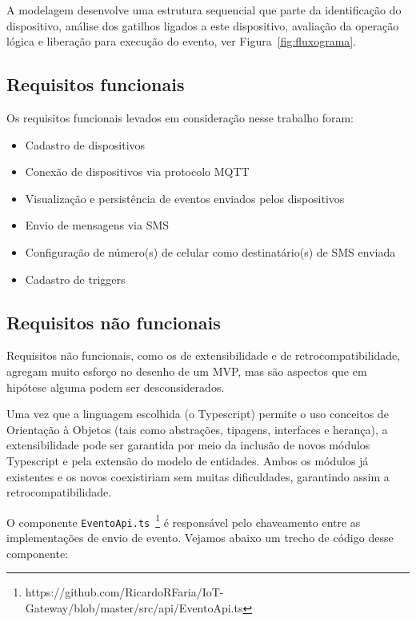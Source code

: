 A modelagem desenvolve uma estrutura sequencial que parte da identificação do dispositivo, análise dos gatilhos ligados a este dispositivo, avaliação da operação lógica e liberação para execução do evento, ver Figura~\ref{fig:fluxograma}.  

\subsection{Requisitos funcionais}
\label{reqFuncionais}

Os requisitos funcionais levados em consideração nesse trabalho foram:

\begin{itemize}
	\item Cadastro de dispositivos
	\item Conexão de dispositivos via protocolo MQTT
	\item Visualização e persistência de eventos enviados pelos dispositivos
	\item Envio de mensagens via SMS
	\item Configuração de número(s) de celular como destinatário(s) de SMS enviada
	\item Cadastro de triggers
\end{itemize}

\subsection{Requisitos não funcionais}
\label{reqNaoFuncionais}

Requisitos não funcionais, como os de extensibilidade e de retrocompatibilidade, agregam muito esforço no desenho de um MVP, mas são aspectos que em hipótese alguma podem ser desconsiderados.

Uma vez que a linguagem escolhida (o Typescript) permite o uso conceitos de Orientação à Objetos (tais como abstrações, tipagens, interfaces e herança), a extensibilidade pode ser garantida por meio da inclusão de novos módulos Typescript e pela extensão do modelo de entidades. Ambos os módulos já existentes e os novos coexistiriam sem muitas dificuldades, garantindo assim a retrocompatibilidade.

O componente \verb|EventoApi.ts|~\footnote{https://github.com/RicardoRFaria/IoT-Gateway/blob/master/src/api/EventoApi.ts} é responsável pelo chaveamento entre as implementações de envio de evento. Vejamos abaixo um trecho de código desse componente:



